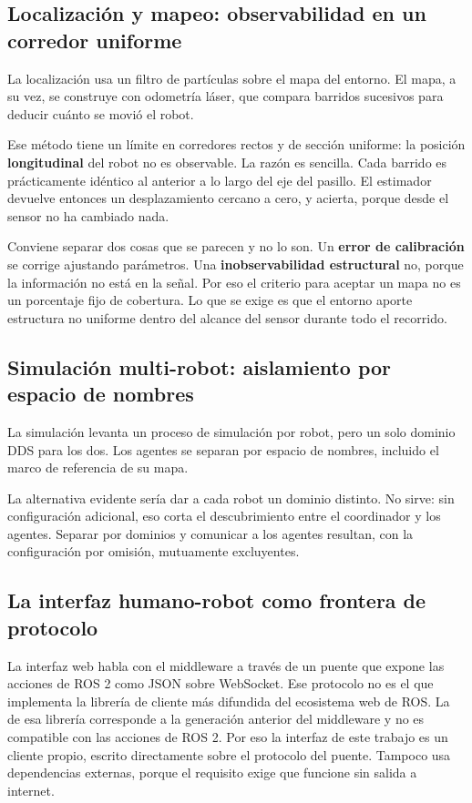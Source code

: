 \subsection{Localización y mapeo: observabilidad en un corredor uniforme}

La localización usa un filtro de partículas sobre el mapa del entorno. El mapa,
a su vez, se construye con odometría láser, que compara barridos sucesivos para
deducir cuánto se movió el robot.

Ese método tiene un límite en corredores rectos y de sección uniforme: la
posición \textbf{longitudinal} del robot no es observable. La razón es sencilla.
Cada barrido es prácticamente idéntico al anterior a lo largo del eje del
pasillo. El estimador devuelve entonces un desplazamiento cercano a cero, y
acierta, porque desde el sensor no ha cambiado nada.

Conviene separar dos cosas que se parecen y no lo son. Un \textbf{error de
calibración} se corrige ajustando parámetros. Una \textbf{inobservabilidad
estructural} no, porque la información no está en la señal. Por eso el criterio
para aceptar un mapa no es un porcentaje fijo de cobertura. Lo que se exige es
que el entorno aporte estructura no uniforme dentro del alcance del sensor
durante todo el recorrido.

\subsection{Simulación multi-robot: aislamiento por espacio de nombres}

La simulación levanta un proceso de simulación por robot, pero un solo dominio
DDS para los dos. Los agentes se separan por espacio de nombres, incluido el
marco de referencia de su mapa.

La alternativa evidente sería dar a cada robot un dominio distinto. No sirve: sin
configuración adicional, eso corta el descubrimiento entre el coordinador y los
agentes. Separar por dominios y comunicar a los agentes resultan, con la
configuración por omisión, mutuamente excluyentes.

\subsection{La interfaz humano-robot como frontera de protocolo}

La interfaz web habla con el middleware a través de un puente que expone las
acciones de ROS 2 como JSON sobre WebSocket. Ese protocolo no es el que
implementa la librería de cliente más difundida del ecosistema web de ROS. La de
esa librería corresponde a la generación anterior del middleware y no es
compatible con las acciones de ROS 2. Por eso la interfaz de este trabajo es un
cliente propio, escrito directamente sobre el protocolo del puente. Tampoco usa
dependencias externas, porque el requisito exige que funcione sin salida a
internet.

